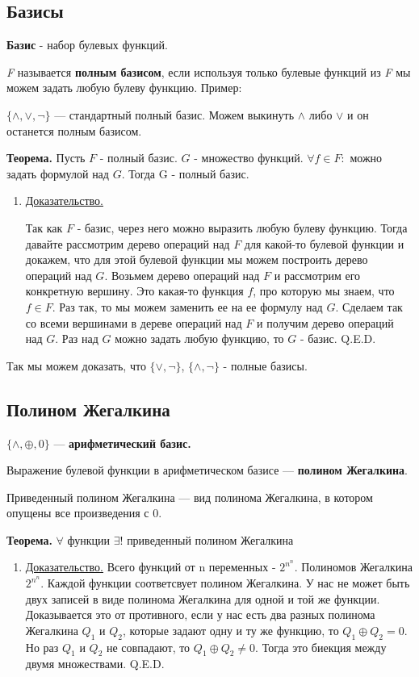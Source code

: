 
\subsection{Базисы}

\textbf{Базис} - набор булевых функций.

\textit{F} называется \textbf{полным базисом}, если используя только булевые функций из \textit{F} мы можем задать любую булеву функцию. Пример:

$\{\wedge, \vee, \neg\}$ ---  стандартный полный базис. Можем выкинуть $\wedge$ либо $\vee$ 
 и он останется полным базисом.

\textbf{Теорема.} Пусть $F$ - полный базис. $G$ - множество функций.
$\forall f \in F:$ можно задать формулой над $G$.
Тогда G - полный базис.

\begin{enumerate}

\item[] \uline{Доказательство.}

Так как $F$ - базис, через него можно выразить любую булеву функцию. Тогда давайте рассмотрим дерево операций над $F$ для какой-то булевой функции и докажем, что для этой булевой функции мы можем построить дерево операций над $G$. Возьмем дерево операций над $F$ и рассмотрим его конкретную вершину. Это какая-то функция $f$, про которую мы знаем, что $f \in F$. Раз так, то мы можем заменить ее на ее формулу над $G$. Сделаем так со всеми вершинами в дереве операций над $F$ и получим дерево операций над $G$. Раз над $G$ можно задать любую функцию, то $G$ - базис. Q.E.D.

\end{enumerate}

Так мы можем доказать, что $\{\vee, \neg\}$, $\{\wedge, \neg\}$ - полные базисы.

\subsection{Полином Жегалкина}

$\{\wedge, \oplus, 0\}$ --- \textbf{арифметический базис.}

Выражение булевой функции в арифметическом базисе --- \textbf{полином Жегалкина}.

Приведенный полином Жегалкина --- вид полинома Жегалкина, в котором опущены все произведения с 0. 

\textbf{Теорема.}  $\forall$ функции $\exists!$ приведенный полином Жегалкина
\begin{enumerate}
\item[] \uline{Доказательство.}
Всего функций от n переменных - $2^{n^n}$. Полиномов Жегалкина  $2^{n^n}$. Каждой функции соответсвует полином Жегалкина. У нас не может быть двух записей в виде полинома Жегалкина для одной и той же функции. Доказывается это от противного, если у нас есть два разных полинома Жегалкина  $Q_1$ и $Q_2$, которые задают одну и ту же функцию, то $Q_1\oplus Q_2 = 0$. Но раз $Q_1$ и $Q_2$ не совпадают, то $Q_1\oplus Q_2\neq0$. Тогда это биекция между двумя множествами. Q.E.D.
\end{enumerate}



